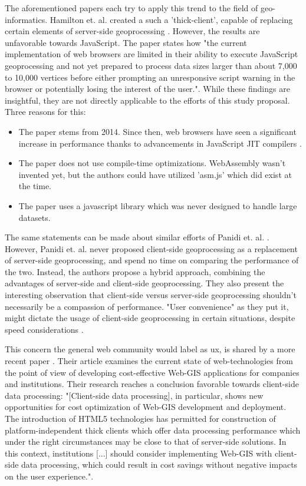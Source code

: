 The aforementioned papers each try to apply this trend to the field of geo-informatics. Hamilton et. al. created a such a 'thick-client', capable of replacing certain elements of server-side geoprocessing \cite{hamilton_client-side_2014}. However, the results are unfavorable towards JavaScript. The paper states how "the current implementation of web browsers are limited in their ability to execute JavaScript geoprocessing and not yet prepared to process data sizes larger than about 7,000 to 10,000 vertices before either prompting an unresponsive script warning in the browser or potentially losing the interest of the user.". While these findings are insightful, they are not directly applicable to the efforts of this study proposal. Three reasons for this:

\begin{itemize}
  \item The paper stems from 2014. Since then, web browsers have seen a significant increase in performance thanks to advancements in JavaScript JIT compilers \cite{haas_bringing_2017, kulawiak_analysis_2019}. 
  \item The paper does not use compile-time optimizations. WebAssembly wasn't invented yet, but the authors could have utilized 'asm.js' \cite{mozilla_asmjs_2013} which did exist at the time. 
  \item The paper uses a javascript library which was never designed to handle large datasets.
\end{itemize}

The same statements can be made about similar efforts of Panidi et. al. \cite{panidi_hybrid_2015}. However, Panidi et. al. never proposed client-side geoprocessing as a replacement of server-side geoprocessing, and spend no time on comparing the performance of the two. Instead, the authors propose a hybrid approach, combining the advantages of server-side and client-side geoprocessing. They also present the interesting observation that client-side versus server-side geoprocessing shouldn't necessarily be a compassion of performance. "User convenience" as they put it, might dictate the usage of client-side geoprocessing in certain situations, despite speed considerations \cite{panidi_hybrid_2015}. 

This concern the general web community would label as \ac{ux}, is shared by a more recent paper \cite{kulawiak_analysis_2019}. Their article examines the current state of web-technologies from the point of view of developing cost-effective Web-GIS applications for companies and institutions. Their research reaches a conclusion favorable towards client-side data processing: "[Client-side data processing], in particular, shows new opportunities for cost optimization of Web-GIS development and deployment. The introduction of HTML5 technologies has permitted for construction of platform-independent thick clients which offer data processing performance which under the right circumstances may be close to that of server-side solutions. In this context, institutions [...] should consider implementing Web-GIS with client-side data processing, which could result in cost savings without negative impacts on the user experience.".

